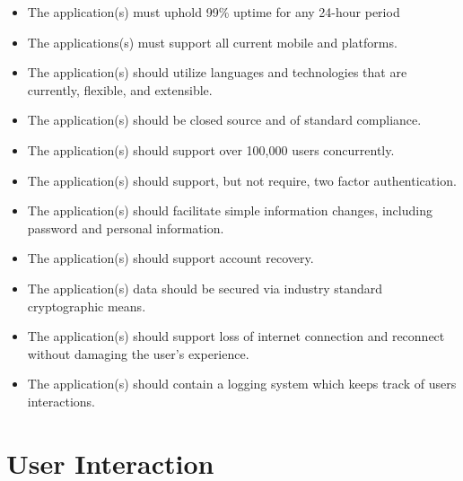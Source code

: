 \documentclass[11pt]{article}
\begin{document}
\begin{itemize}
	\item The application(s) must uphold 99\% uptime for any 24-hour period
	\item The applications(s) must support all current mobile and platforms.
	\item The application(s) should utilize languages and technologies that are currently, flexible, and extensible.
	\item The application(s) should be closed source and of standard compliance.
	\item The application(s) should support over 100,000 users concurrently.
	\item The application(s) should support, but not require, two factor authentication.
	\item The application(s) should facilitate simple information changes, including password and personal information.
	\item The application(s) should support account recovery.
	\item The application(s) data should be secured via industry standard cryptographic means.
	\item The application(s) should support loss of internet connection and reconnect without damaging the user's experience.
	\item The application(s) should contain a logging system which keeps track of users interactions.
\end{itemize}

%
\section{User Interaction}\label{user-interaction}
\end{document}
